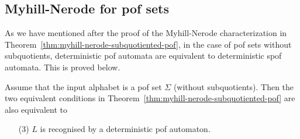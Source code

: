 \subsection*{Myhill-Nerode for pof sets}
As we have mentioned after the proof of the Myhill-Nerode characterization in Theorem~\ref{thm:myhill-nerode-subquotiented-pof}, in the case of pof sets without subquotients, deterministic pof automata are equivalent to deterministic  spof automata. This is proved below.
\begin{theorem}\label{thm:myhill-nerode-pof}
    Assume that the input alphabet is a pof set $\Sigma$ (without subquotients). Then the two equivalent conditions in Theorem~\ref{thm:myhill-nerode-subquotiented-pof} are also equivalent to 
    \begin{enumerate}
        \item[(3)]\label{item:myhill-nerode-pof-recognised} $L$ is recognised by a deterministic pof automaton.
    \end{enumerate}
\end{theorem}

